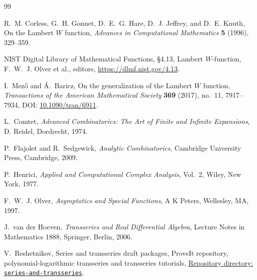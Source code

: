 \documentclass[11pt,a4paper]{article}
\numberwithin{equation}{section}
\theoremstyle{definition}
\theoremstyle{remark}
\begin{document}
\begin{thebibliography}{99}

R.~M. Corless, G.~H. Gonnet, D.~E.~G. Hare, D.~J. Jeffrey, and D.~E. Knuth,
\newblock On the Lambert \(W\) function,
\newblock \emph{Advances in Computational Mathematics} \textbf{5} (1996),
329--359.

NIST Digital Library of Mathematical Functions,
\newblock \S4.13, Lambert \(W\)-function,
\newblock F.~W.~J. Olver et al., editors,
\newblock \url{https://dlmf.nist.gov/4.13}.

I.~Mez\H{o} and \'A.~Baricz,
\newblock On the generalization of the Lambert \(W\) function,
\newblock \emph{Transactions of the American Mathematical Society}
\textbf{369} (2017), no.~11, 7917--7934,
\newblock DOI: \href{https://doi.org/10.1090/tran/6911}{10.1090/tran/6911}.

L.~Comtet,
\newblock \emph{Advanced Combinatorics: The Art of Finite and Infinite
Expansions},
\newblock D. Reidel, Dordrecht, 1974.

P.~Flajolet and R.~Sedgewick,
\newblock \emph{Analytic Combinatorics},
\newblock Cambridge University Press, Cambridge, 2009.

P.~Henrici,
\newblock \emph{Applied and Computational Complex Analysis}, Vol.~2,
\newblock Wiley, New York, 1977.

F.~W.~J. Olver,
\newblock \emph{Asymptotics and Special Functions},
\newblock A K Peters, Wellesley, MA, 1997.

J.~van der Hoeven,
\newblock \emph{Transseries and Real Differential Algebra},
\newblock Lecture Notes in Mathematics 1888, Springer, Berlin, 2006.

V.~Reshetnikov,
\newblock Series and transseries draft packages,
\newblock ProveIt repository, polynomial-logarithmic transseries and
transseries tutorials,
\newblock \href{https://github.com/VladimirReshetnikov/ProveIt/tree/main/Analysis/FabiusFunction/docs/semi-formalized-research-frontiers/drafts/series-and-transseries}{Repository directory: \texttt{series-and-transseries}}.

\end{thebibliography}
\end{document}
